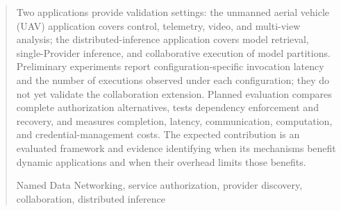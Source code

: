 \documentclass[
    doctoral,
    proposal,
    showabstract,
    secnum,
    nohyphenation,
    pdfonly,
    noboundcover
]{uofm}
\begin{document}
\begin{abstract}
Two applications provide validation settings: the unmanned aerial vehicle (UAV) application covers control, telemetry, video, and multi-view analysis; the distributed-inference application covers model retrieval, single-Provider inference, and collaborative execution of model partitions. Preliminary experiments report configuration-specific invocation latency and the number of executions observed under each configuration; they do not yet validate the collaboration extension. Planned evaluation compares complete authorization alternatives, tests dependency enforcement and recovery, and measures completion, latency, communication, computation, and credential-management costs. The expected contribution is an evaluated framework and evidence identifying when its mechanisms benefit dynamic applications and when their overhead limits those benefits.
\begin{keywords}
Named Data Networking, service authorization, provider discovery, collaboration, distributed inference
\end{keywords}
\end{abstract}
\tableofcontents
\mainmatter
\newcommand{\proposalroot}{..}

\appendix



\end{document}
